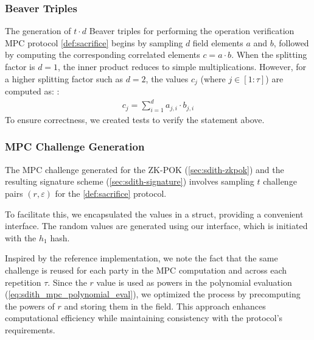 \documentclass[11pt]{report}
\theoremstyle{definition}
\theoremstyle{plain}
\newcommand{\todo}[1]{{\color[rgb]{.5,0,0}\textbf{$\blacktriangleright$#1$\blacktriangleleft$}}}
\begin{document}

\subsubsection{Beaver Triples}
The generation of $t \cdot d$ Beaver triples for performing the operation verification MPC protocol \autoref{def:sacrifice} begins by sampling $d$ field elements $a$ and $b$, followed by computing the corresponding correlated elements $c = a \cdot b$. When the splitting factor is $d=1$, the inner product reduces to simple multiplications. However, for a higher splitting factor such as $d=2$, the values $c_j$ (where $j \in [1:\tau]$) are computed as:
:
\begin{align}
  c_j = \sum_{i=1}^{d} a_{ j,i } \cdot b_{j,i}
\end{align}
To ensure correctness, we created tests to verify the statement above.

\subsubsection{MPC Challenge Generation}

The MPC challenge generated for the ZK-POK (\autoref{sec:sdith-zkpok}) and the resulting signature scheme (\autoref{sec:sdith-signature}) involves sampling $t$ challenge pairs $(r, \varepsilon)$ for the \autoref{def:sacrifice} protocol.

To facilitate this, we encapsulated the values in a  struct, providing a convenient interface. The random values are generated using our  interface, which is initiated with the $h_1$ hash.

Inspired by the reference implementation, we note the fact that the same challenge is reused for each party in the MPC computation and across each repetition $\tau$. Since the $r$ value is used as powers in the polynomial evaluation (\autoref{eq:sdith_mpc_polynomial_eval}), we optimized the process by precomputing the powers of $r$ and storing them in the  field. This approach enhances computational efficiency while maintaining consistency with the protocol's requirements.
\end{document}
